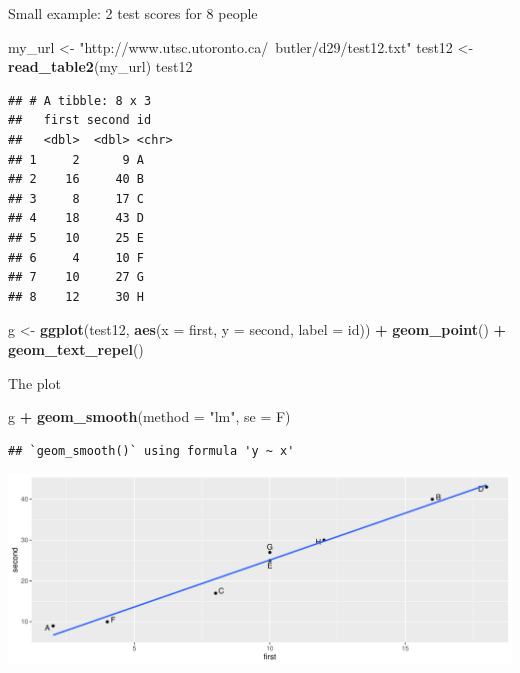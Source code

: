 \documentclass[
  ignorenonframetext,
]{beamer}
\newenvironment{Shaded}{\begin{snugshade}}{\end{snugshade}}
\newcommand{\DataTypeTok}[1]{\textcolor[rgb]{0.13,0.29,0.53}{#1}}
\newcommand{\KeywordTok}[1]{\textcolor[rgb]{0.13,0.29,0.53}{\textbf{#1}}}
\newcommand{\NormalTok}[1]{#1}
\newcommand{\OperatorTok}[1]{\textcolor[rgb]{0.81,0.36,0.00}{\textbf{#1}}}
\newcommand{\StringTok}[1]{\textcolor[rgb]{0.31,0.60,0.02}{#1}}
\begin{document}
\begin{frame}[fragile]{Small example: 2 test scores for 8 people}
\protect\hypertarget{small-example-2-test-scores-for-8-people}{}

\small

\begin{Shaded}
\begin{Highlighting}[]
\NormalTok{my_url <-}\StringTok{ "http://www.utsc.utoronto.ca/~butler/d29/test12.txt"}
\NormalTok{test12 <-}\StringTok{ }\KeywordTok{read_table2}\NormalTok{(my_url)}
\NormalTok{test12}
\end{Highlighting}
\end{Shaded}

\begin{verbatim}
## # A tibble: 8 x 3
##   first second id   
##   <dbl>  <dbl> <chr>
## 1     2      9 A    
## 2    16     40 B    
## 3     8     17 C    
## 4    18     43 D    
## 5    10     25 E    
## 6     4     10 F    
## 7    10     27 G    
## 8    12     30 H
\end{verbatim}

\begin{Shaded}
\begin{Highlighting}[]
\NormalTok{g <-}\StringTok{ }\KeywordTok{ggplot}\NormalTok{(test12, }\KeywordTok{aes}\NormalTok{(}\DataTypeTok{x =}\NormalTok{ first, }\DataTypeTok{y =}\NormalTok{ second, }\DataTypeTok{label =}\NormalTok{ id)) }\OperatorTok{+}
\StringTok{  }\KeywordTok{geom_point}\NormalTok{() }\OperatorTok{+}\StringTok{ }\KeywordTok{geom_text_repel}\NormalTok{()}
\end{Highlighting}
\end{Shaded}

\normalsize

\end{frame}

\begin{frame}[fragile]{The plot}
\protect\hypertarget{the-plot-8}{}

\begin{Shaded}
\begin{Highlighting}[]
\NormalTok{g }\OperatorTok{+}\StringTok{ }\KeywordTok{geom_smooth}\NormalTok{(}\DataTypeTok{method =} \StringTok{"lm"}\NormalTok{, }\DataTypeTok{se =}\NormalTok{ F)}
\end{Highlighting}
\end{Shaded}

\begin{verbatim}
## `geom_smooth()` using formula 'y ~ x'
\end{verbatim}

\includegraphics{slides_d29_files/figure-beamer/ff2-1.pdf}

\end{frame}
\end{document}
